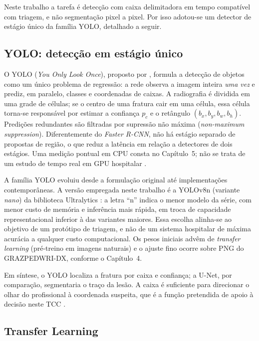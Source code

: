 \documentclass[12pt,oneside,a4paper,chapter=TITLE,section=TITLE,sumario=tradicional]{abntex2}
\begin{document}
Neste trabalho a tarefa é detecção com caixa delimitadora em tempo compatível com triagem, e não segmentação pixel a pixel. Por isso adotou-se um detector de estágio único da família YOLO, detalhado a seguir.

\subsection{YOLO: detecção em estágio único}

O YOLO (\textit{You Only Look Once}), proposto por , formula a detecção de objetos como um único problema de regressão: a rede observa a imagem inteira \textit{uma vez} e prediz, em paralelo, classes e coordenadas de caixas. A radiografia é dividida em uma grade de células; se o centro de uma fratura cair em uma célula, essa célula torna-se responsável por estimar a confiança $p_c$ e o retângulo $(b_x, b_y, b_w, b_h)$. Predições redundantes são filtradas por supressão não máxima (\textit{non-maximum suppression}). Diferentemente do \textit{Faster R-CNN}, não há estágio separado de propostas de região, o que reduz a latência em relação a detectores de dois estágios. Uma medição pontual em CPU consta no Capítulo~5; não se trata de um estudo de tempo real em GPU hospitalar \cite{redmon2016you,kim2020}.

A família YOLO evoluiu desde a formulação original até implementações contemporâneas. A versão empregada neste trabalho é a YOLOv8n (variante \textit{nano}) da biblioteca Ultralytics \cite{jocher2023ultralytics}: a letra ``n'' indica o menor modelo da série, com menor custo de memória e inferência mais rápida, em troca de capacidade representacional inferior à das variantes maiores. Essa escolha alinha-se ao objetivo de um protótipo de triagem, e não de um sistema hospitalar de máxima acurácia a qualquer custo computacional. Os pesos iniciais advêm de \textit{transfer learning} (pré-treino em imagens naturais) e o ajuste fino ocorre sobre PNG do GRAZPEDWRI-DX, conforme o Capítulo~4.

Em síntese, o YOLO localiza a fratura por caixa e confiança; a U-Net, por comparação, segmentaria o traço da lesão. A caixa é suficiente para direcionar o olhar do profissional à coordenada suspeita, que é a função pretendida de apoio à decisão neste TCC \cite{redmon2016you,jocher2023ultralytics}.

\subsection{Transfer Learning}
\end{document}
